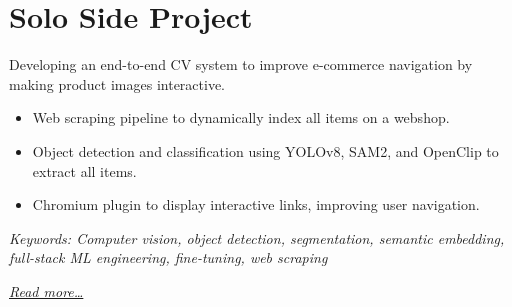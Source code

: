\section{Solo Side Project}
Developing an end-to-end CV system to improve e-commerce navigation by making product images interactive.

\begin{itemize}
  \item Web scraping pipeline to dynamically index all items on a webshop.
  \item Object detection and classification using YOLOv8, SAM2, and OpenClip to extract all items.
  \item Chromium plugin to display interactive links, improving user navigation.
\end{itemize}

{\footnotesize\textit{Keywords: Computer vision, object detection, segmentation, semantic embedding, full-stack ML engineering, fine-tuning, web scraping}}

\hfill{\small{\textit{\hyperref[sec:iris]{Read more…}}}}

